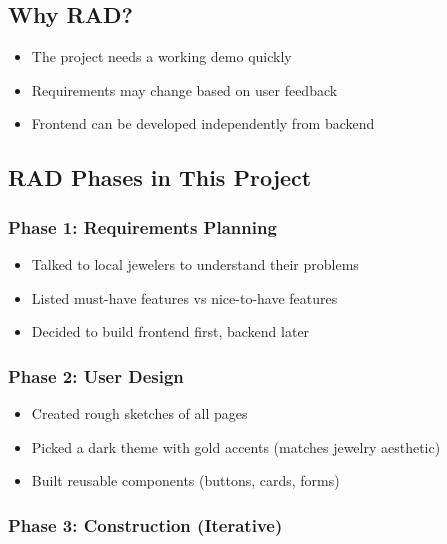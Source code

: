 \documentclass[12pt,a4paper]{article}
\begin{document}
\subsection{Why RAD?}

\begin{itemize}
    \item The project needs a working demo quickly
    \item Requirements may change based on user feedback
    \item Frontend can be developed independently from backend
\end{itemize}

\subsection{RAD Phases in This Project}

\subsubsection{Phase 1: Requirements Planning}
\begin{itemize}
    \item Talked to local jewelers to understand their problems
    \item Listed must-have features vs nice-to-have features
    \item Decided to build frontend first, backend later
\end{itemize}

\subsubsection{Phase 2: User Design}
\begin{itemize}
    \item Created rough sketches of all pages
    \item Picked a dark theme with gold accents (matches jewelry aesthetic)
    \item Built reusable components (buttons, cards, forms)
\end{itemize}

\subsubsection{Phase 3: Construction (Iterative)}
\end{document}
